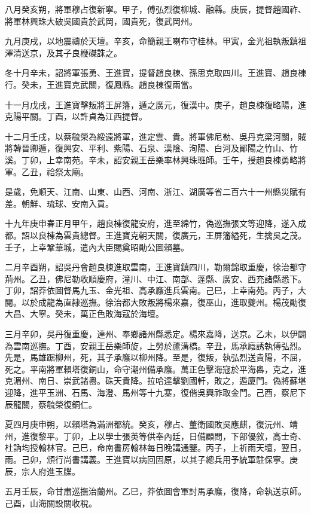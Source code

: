 \begin{pinyinscope}
八月癸亥朔，將軍穆占復新寧。甲子，傅弘烈復柳城、融縣。庚辰，提督趙國祚、將軍林興珠大破吳國貴於武岡，國貴死，復武岡州。

九月庚戌，以地震禱於天壇。辛亥，命簡親王喇布守桂林。甲寅，金光祖執叛鎮祖澤清送京，及其子良楩磔誅之。

冬十月辛未，詔將軍張勇、王進寶，提督趙良棟、孫思克取四川。王進寶、趙良棟行。癸未，王進寶克武關，復鳳縣。趙良棟復兩當。

十一月戊戌，王進寶擊叛將王屏籓，遁之廣元，復漢中。庚子，趙良棟復略陽，進克陽平關。丁酉，以許貞為江西提督。

十二月壬戌，以蔡毓榮為綏遠將軍，進定雲、貴。將軍佛尼勒、吳丹克梁河關，賊將韓晉卿遁，復興安、平利、紫陽、石泉、漢陰、洵陽、白河及鄖陽之竹山、竹溪。丁卯，上幸南苑。辛未，詔安親王岳樂率林興珠班師。壬午，授趙良棟勇略將軍。乙丑，祫祭太廟。

是歲，免順天、江南、山東、山西、河南、浙江、湖廣等省二百六十一州縣災賦有差。朝鮮、琉球、安南入貢。

十九年庚申春正月甲午，趙良棟復龍安府，進至綿竹，偽巡撫張文等迎降，遂入成都。詔以良棟為雲貴總督。王進寶克朝天關，復廣元，王屏籓縊死，生擒吳之茂。壬子，上幸鞏華城，遣內大臣賜奠昭勛公圖賴墓。

二月辛酉朔，詔吳丹會趙良棟進取雲南，王進寶鎮四川，勒爾錦取重慶，徐治都守荊州。乙丑，佛尼勒收順慶府，潼川、中江、南部、蓬縣、廣安、西充諸縣悉下。丁卯，詔莽依圖督馬九玉、金光祖、高承廕進兵雲南。己巳，上幸南苑。丙子，大閱。以於成龍為直隸巡撫。徐治都大敗叛將楊來嘉，復巫山，進取夔州。楊茂勛復大昌、大寧。癸未，萬正色敗海寇於海壇。

三月辛卯，吳丹復重慶，達州、奉鄉諸州縣悉定。楊來嘉降，送京。乙未，以伊闢為雲南巡撫。丁酉，安親王岳樂師旋，上勞於蘆溝橋。辛丑，馬承廕誘執傅弘烈。先是，馬雄踞柳州，死，其子承廕以柳州降。至是，復叛，執弘烈送貴陽，不屈，死之。平南將軍賴塔復銅山，命守潮州備承廕。萬正色擊海寇於平海嶴，克之，進克湄州、南日、崇武諸嶴。硃天貴降。拉哈達擊劉國軒，敗之，遁廈門。偽將蘇堪迎降，進平玉洲、石馬、海澄、馬州等十九寨，復偕吳興祚取金門。己酉，察尼下辰龍關，蔡毓榮復銅仁。

夏四月庚申朔，以賴塔為滿洲都統。癸亥，穆占、董衛國敗吳應麒，復沅州、靖州，進復黎平。丁卯，上以學士張英等供奉內廷，日備顧問，下部優敘，高士奇、杜訥均授翰林官。己巳，命南書房翰林每日晚講通鑒。丙子，上祈雨天壇，翌日，雨。己卯，頒行尚書講義。王進寶以病回固原，以其子總兵用予統軍駐保寧。庚辰，宗人府進玉牒。

五月壬辰，命甘肅巡撫治蘭州。乙巳，莽依圖會軍討馬承廕，復降，命執送京師。己酉，山海關設關收稅。


\end{pinyinscope}
